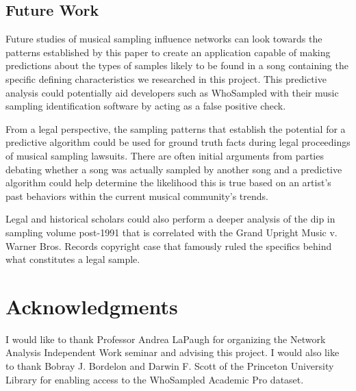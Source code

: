 \documentclass[pageno]{jpaper}
\begin{document}
\subsection{Future Work}
Future studies of musical sampling influence networks can look towards the patterns established by this paper to create an application capable of making predictions about the types of samples likely to be found in a song containing the specific defining characteristics we researched in this project. This predictive analysis could potentially aid developers such as WhoSampled with their music sampling identification software by acting as a false positive check.

From a legal perspective, the sampling patterns that establish the potential for a predictive algorithm could be used for ground truth facts during legal proceedings of musical sampling lawsuits. There are often initial arguments from parties debating whether a song was actually sampled by another song and a predictive algorithm could help determine the likelihood this is true based on an artist's past behaviors within the current musical community's trends.

Legal and historical scholars could also perform a deeper analysis of the dip in sampling volume post-1991 that is correlated with the Grand Upright Music v. Warner Bros. Records copyright case that famously ruled the specifics behind what constitutes a legal sample.
\section{Acknowledgments}
I would like to thank Professor Andrea LaPaugh for organizing the Network Analysis Independent Work seminar and advising this project. I would also like to thank Bobray J. Bordelon and Darwin F. Scott of the Princeton University Library for enabling access to the WhoSampled Academic Pro dataset.
\nocite{*}


\end{document}

